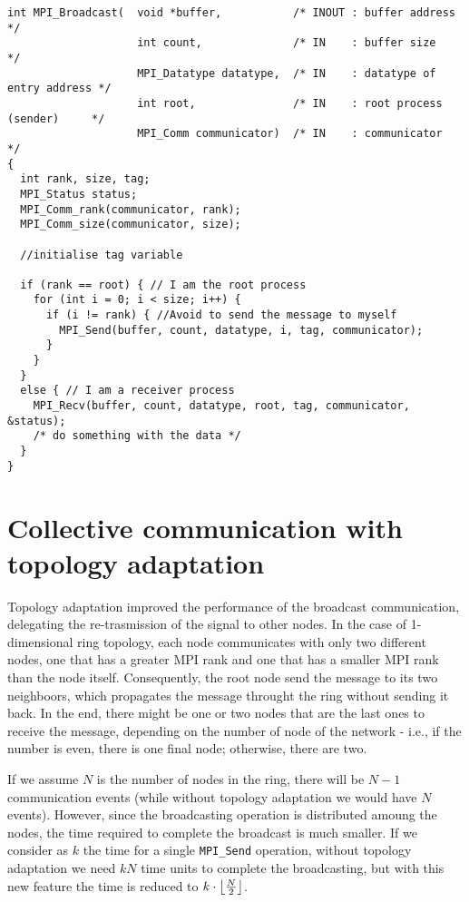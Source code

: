 \documentclass[a4paper]{article}
\DeclarePairedDelimiter\floor{\lfloor}{\rfloor}
\begin{document}
\begin{verbatim}
int MPI_Broadcast(  void *buffer,           /* INOUT : buffer address            */
                    int count,              /* IN    : buffer size               */
                    MPI_Datatype datatype,  /* IN    : datatype of entry address */
                    int root,               /* IN    : root process (sender)     */
                    MPI_Comm communicator)  /* IN    : communicator              */
{
  int rank, size, tag;
  MPI_Status status;
  MPI_Comm_rank(communicator, rank);
  MPI_Comm_size(communicator, size);

  //initialise tag variable

  if (rank == root) { // I am the root process
    for (int i = 0; i < size; i++) {
      if (i != rank) { //Avoid to send the message to myself
        MPI_Send(buffer, count, datatype, i, tag, communicator);
      }
    }
  }
  else { // I am a receiver process
    MPI_Recv(buffer, count, datatype, root, tag, communicator, &status);
    /* do something with the data */
  }
}

\end{verbatim}

\newpage

\section{Collective communication with topology adaptation}

Topology adaptation improved the performance of the broadcast communication, delegating the re-trasmission of the signal to other nodes. In the case of 1-dimensional ring topology, each node communicates with only two different nodes, one that has a greater MPI rank and one that has a smaller MPI rank than the node itself. Consequently, the root node send the message to its two neighboors, which propagates the message throught the ring without sending it back. In the end, there might be one or two nodes that are the last ones to receive the message, depending on the number of node of the network - i.e., if the number is even, there is one final node; otherwise, there are two.

If we assume $N$ is the number of nodes in the ring, there will be $N-1$ communication events (while without topology adaptation we would have $N$ events). However, since the broadcasting operation is distributed amoung the nodes, the time required to complete the broadcast is much smaller. If we consider as $k$ the time for a single \texttt{MPI\_Send} operation, without topology adaptation we need $kN$ time units to complete the broadcasting, but with this new feature the time is reduced to $k \cdot \floor*{\frac{N}{2}}$.
\end{document}
